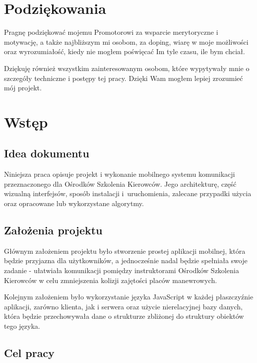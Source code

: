 \documentclass[twoside,a4paper]{book}
\begin{document}
\frontmatter
\tableofcontents


\chapter*{Podziękowania}
Pragnę podziękować mojemu Promotorowi za wsparcie merytoryczne i motywację, a także najbliższym mi osobom, za doping, wiarę w moje możliwości oraz wyrozumiałość, kiedy nie mogłem poświęcać Im tyle czasu, ile bym chciał.

Dziękuję również wszystkim zainteresowanym osobom, które wypytywały mnie o szczegóły techniczne i postępy tej pracy. Dzięki Wam mogłem lepiej zrozumieć mój projekt.


\mainmatter

\chapter{Wstęp}
\section{Idea dokumentu}

Niniejsza praca opisuje projekt i wykonanie mobilnego systemu komunikacji przeznaczonego dla Ośrodków Szkolenia Kierowców. Jego architekturę, część wizualną interfejsów, sposób instalacji i~uruchomienia, zalecane przypadki użycia oraz opracowane lub wykorzystane algorytmy.


\section{Założenia projektu}

Głównym założeniem projektu było stworzenie prostej aplikacji mobilnej, która będzie przyjazna dla użytkowników, a jednocześnie nadal będzie spełniała swoje zadanie - ułatwiała komunikacji pomiędzy instruktorami Ośrodków Szkolenia Kierowców w celu zmniejszenia kolizji zajętości placów manewrowych.

Kolejnym założeniem było wykorzystanie języka JavaScript w każdej płaszczyźnie aplikacji, zarówno klienta, jak i serwera oraz użycie nierelacyjnej bazy danych, która będzie przechowywała dane o strukturze zbliżonej do struktury obiektów tego języka.


\section{Cel pracy}
\end{document}
